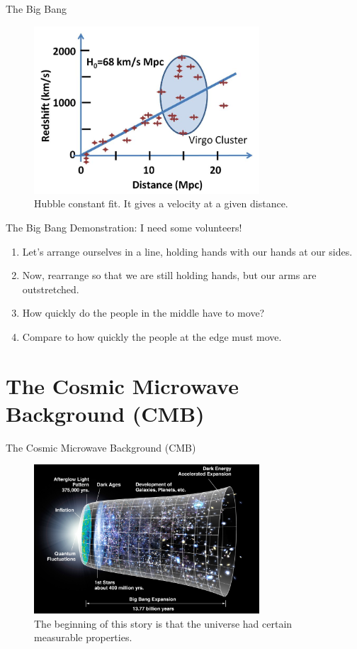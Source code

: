 \documentclass{beamer}
\begin{document}
\begin{frame}{The Big Bang}
\begin{figure}
\centering
\includegraphics[width=0.75\textwidth]{hubbleConstant.jpg}
\caption{\label{fig:cmb4} Hubble constant fit.  It gives a velocity at a given distance.}
\end{figure}
\end{frame}

\begin{frame}{The Big Bang}
Demonstration: I need some volunteers!
\begin{enumerate}
\item Let's arrange ourselves in a line, holding hands with our hands at our sides.
\item Now, rearrange so that we are still holding hands, but our arms are outstretched.
\item How quickly do the people in the middle have to move?
\item Compare to how quickly the people at the edge must move.
\end{enumerate}
\end{frame}

\section{The Cosmic Microwave Background (CMB)}

\begin{frame}{The Cosmic Microwave Background (CMB)}
\begin{figure}
\centering
\includegraphics[width=0.75\textwidth]{CMB.jpg}
\caption{\label{fig:cmb5} The beginning of this story is that the universe had certain measurable properties.}
\end{figure}
\end{frame}
\end{document}
